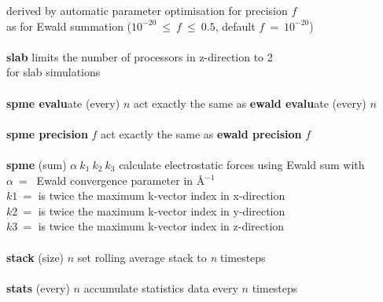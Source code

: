 \begin{tabbing}
\>                                              \> derived by automatic parameter optimisation for precision $f$ \\
\>                                              \> as for Ewald summation ($10^{-20}~\le~f~\le~0.5$, default $f~=~10^{-20}$) \\
\>                                              \> \\
\> {\bf slab}                                   \> limits the number of processors in z-direction to 2 \\
\>                                              \> for slab simulations \\
\>                                              \> \\
\> {\bf spme evalu}ate (every) $n$              \> act exactly the same as {\bf ewald evalu}ate (every) $n$ \\
\>                                              \> \\
\> {\bf spme precision} $f$                     \> act exactly the same as {\bf ewald precision} $f$ \\
\>                                              \> \\
\> {\bf spme} (sum) $\alpha~k_{1}~k_{2}~k_{3}$  \> calculate electrostatic forces using Ewald sum with \\
\>                                              \> $\alpha~=~$ Ewald convergence parameter in \AA$^{-1}$ \\
\>                                              \> $k1~=$ is twice the maximum k-vector index in x-direction \\
\>                                              \> $k2~=$ is twice the maximum k-vector index in y-direction \\
\>                                              \> $k3~=$ is twice the maximum k-vector index in z-direction \\
\>                                              \> \\
\> {\bf stack} (size) $n$                       \> set rolling average stack to {\em n} timesteps \\
\>                                              \> \\
\> {\bf stats} (every) $n$                      \> accumulate statistics data every $n$ timesteps \\
\>                                              \> \\

\end{tabbing}
